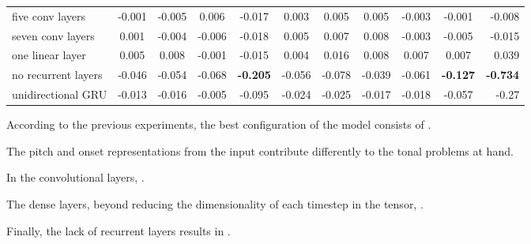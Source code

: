\begin{table}[]
\begin{tabular}{lcccccccccr}
    five conv layers    & -0.001         & -0.005         & 0.006           & -0.017          & 0.003           & 0.005           & 0.005           & -0.003          & -0.001          & -0.008               \\
    seven conv layers   & 0.001          & -0.004         & -0.006          & -0.018          & 0.005           & 0.007           & 0.008           & -0.003          & -0.005          & -0.015               \\
    one linear layer    & 0.005          & 0.008          & -0.001          & -0.015          & 0.004           & 0.016           & 0.008           & 0.007           & 0.007           & 0.039                \\
    no recurrent layers & -0.046         & -0.054         & -0.068          & \textbf{-0.205} & -0.056          & -0.078          & -0.039          & -0.061          & \textbf{-0.127} & \textbf{-0.734}      \\
    unidirectional GRU  & -0.013         & -0.016         & -0.005          & -0.095          & -0.024          & -0.025          & -0.017          & -0.018          & -0.057          & -0.27               
    \end{tabular}
    \end{table}

According to the previous experiments, the best
configuration of the model consists of .

The pitch and onset representations from the input
contribute differently to the tonal problems at hand.

In the convolutional layers, .

The dense layers, beyond reducing the dimensionality of each
timestep in the tensor, .

Finally, the lack of recurrent layers results in
.
